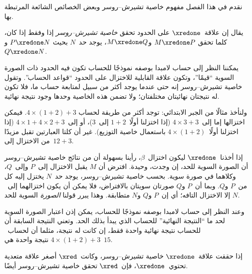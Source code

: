 \documentclass[../../../include/open-logic-section]{subfiles}
\begin{document}


نقدم في هذا الفصل مفهوم خاصية تشيرش--روسر وبعض الخصائص الشائعة
المرتبطة بها.

\begin{defn} يقال إن علاقة~$\xredone$ على
  الحدود تحقق \emph{خاصية تشيرش--روسر} إذا وفقط إذا كان، كلما تحقق
  $M \xredone P$ و$M \xredone Q$، يوجد حد~$N$ بحيث
  $P \xredone N$ و$Q \xredone N$.
\end{defn}

يمكننا النظر إلى حساب لامبدا بوصفه نموذجًا للحساب تكون فيه الحدود ذات
الصورة السوية ``قيمًا''، وتكون علاقة القابلية للاختزال على الحدود
``قواعد الحساب''. وتقول خاصية تشيرش--روسر إنه حتى عندما يوجد أكثر من
سبيل لمتابعة حساب ما، فلا تكون له نتيجتان نهائيتان مختلفتان؛ ولا
تضمن هذه الخاصية وحدها وجود نتيجة نهائية.

ولنأخذ مثالًا من الجبر الابتدائي: توجد أكثر من طريقة لحساب
$4 \times (1+2) + 3$. فيمكن اختزالها إما إلى~$4 \times 3+3$ (إذا
اختزلنا أولًا~$1+2$ إلى~$3$)، أو إلى~$4 \times 1+4 \times 2+3$
(إذا اختزلنا أولًا~$4 \times (1+2)$ باستعمال خاصية التوزيع). غير أن
كلتا العبارتين تقبل مزيدًا من الاختزال إلى~$12+3$.

إذا أخذنا~$\xredone$ ليكون اختزال~$\beta$، رأينا بسهولة أن من نتائج
خاصية تشيرش--روسر أن الصورة السوية للحد، إن وجدت، وحيدة. افترض أن
$M$ يقبل الاختزال إلى~$P$ وإلى~$Q$، وكلاهما في صورة سوية. بحسب خاصية
تشيرش--روسر، يوجد حد~$N$ يختزل إليه كل من~$P$ و$Q$. وبما أن~$P$
و$Q$ صورتان سويتان بالافتراض، فلا يمكن أن يكون اختزالهما إلى~$N$ إلا
الاختزال التافه؛ أي إن~$P$ و$Q$ و$N$ متطابقة. وهذا يبرر قولنا
\emph{الصورة} السوية للحد.

وعند النظر إلى حساب لامبدا بوصفه نموذجًا للحساب، يمكن إذن اعتبار
الصورة السوية لحد ما ``النتيجة النهائية'' للحساب الذي يبدأ بذلك الحد.
وتعني النتيجة السابقة أن للحساب نتيجة نهائية واحدة فقط، إن كانت له
نتيجة، مثلما أن لحساب~$4 \times (1+2)+3$ نتيجة واحدة هي~$15$.

\begin{thm} 
  إذا حققت علاقة~$\xredone$ خاصية تشيرش--روسر، وكانت~$\xred$ أصغر
  علاقة متعدية تحتوي~$\xredone$، فإن~$\xred$ تحقق خاصية
  تشيرش--روسر أيضًا.
\end{thm}
\end{document}
